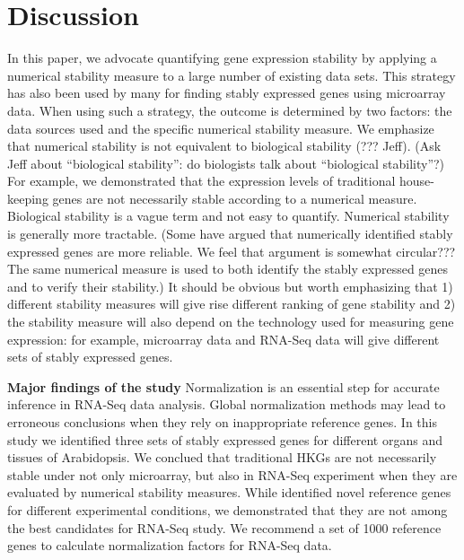 \documentclass[11pt, a4paper]{article}
\begin{document}
  \section{Discussion}
In this paper, we advocate quantifying gene expression stability by applying a
numerical stability measure to a large number of existing data sets.  This
strategy has also been used by many for finding stably expressed genes using
microarray data.  When using such a strategy, the outcome is determined by two
factors: the data sources used and the specific numerical stability measure.
We emphasize that numerical stability is not equivalent to biological
stability (??? Jeff).  (Ask Jeff about  ``biological stability'': do
biologists talk about ``biological stability''?) For example, we demonstrated
that the expression levels of traditional house-keeping genes are not
necessarily stable according to a numerical measure. 
Biological stability is a vague term and not easy to quantify.  Numerical
stability is generally more tractable. (Some have argued that numerically
identified stably expressed genes are more reliable. We feel that argument is
somewhat circular??? The same numerical measure is used to both identify the
stably expressed genes and to verify their stability.) It should be obvious
but worth emphasizing that 1) different stability measures will give rise
different ranking of gene stability and 2) the stability measure will also
depend on the technology used for measuring gene expression: for example,
microarray data and RNA-Seq data will give different sets of stably expressed
genes.


  \textbf{Major findings of the study}
  Normalization is an essential step for accurate inference in RNA-Seq data analysis. Global normalization methods may lead to erroneous conclusions when they rely on inappropriate reference genes. In this study we identified three sets of stably expressed genes for different organs and tissues of Arabidopsis. We conclued that traditional HKGs are not necessarily stable under not only microarray, but also in RNA-Seq experiment when they are evaluated by numerical stability measures. While \cite{czechowski2005genome} identified novel reference genes for different experimental conditions, we demonstrated that they are not among the best candidates for RNA-Seq study. We recommend a set of 1000 reference genes to calculate normalization factors for RNA-Seq data.  
   
\end{document}
